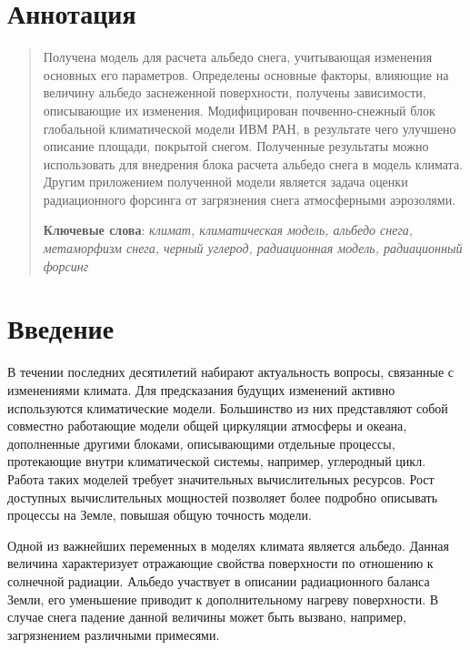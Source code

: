 \documentclass[a4paper, fontsize=14pt]{scrartcl}
\begin{document}
\author{Черненков Алексей Юрьевич}

\section*{Аннотация}
\begin{abstract}

Получена модель для расчета альбедо снега, учитывающая изменения основных его параметров. Определены основные факторы, влияющие на величину альбедо заснеженной поверхности, получены зависимости, описывающие их изменения. Модифицирован почвенно-снежный блок глобальной климатической модели ИВМ РАН, в результате чего улучшено описание площади, покрытой снегом. Полученные результаты можно использовать для внедрения блока расчета альбедо снега в модель климата. Другим приложением полученной модели является задача оценки радиационного форсинга от загрязнения снега атмосферными аэрозолями. 
  
  \bigskip
  \textbf{Ключевые слова}: \emph{климат, климатическая модель, альбедо снега, метаморфизм снега, черный углерод, радиационная модель, радиационный форсинг}
\end{abstract}


\newpage
{}
{}
\tableofcontents


\newpage
\section*{Введение}

В течении последних десятилетий набирают актуальность вопросы, связанные с изменениями климата. Для предсказания будущих изменений активно используются климатические модели. Большинство из них представляют собой совместно работающие модели общей циркуляции атмосферы и океана, дополненные другими блоками, описывающими отдельные процессы, протекающие внутри климатической системы, например, углеродный цикл. Работа таких моделей требует значительных вычислительных ресурсов. Рост доступных вычислительных мощностей позволяет более подробно описывать процессы на Земле, повышая общую точность модели. 

Одной из важнейших переменных в моделях климата является альбедо. Данная величина характеризует отражающие свойства поверхности по отношению к солнечной радиации. Альбедо участвует в описании радиационного баланса Земли, его уменьшение приводит к дополнительному нагреву поверхности. В случае снега падение данной величины может быть вызвано, например, загрязнением различными примесями.
\end{document}
